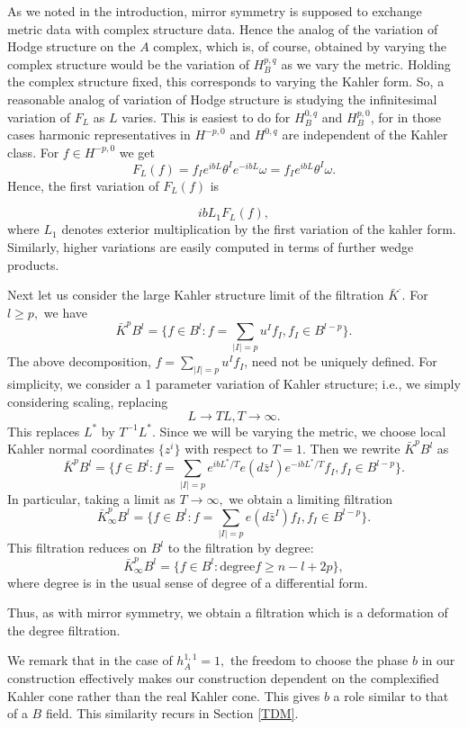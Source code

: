 \documentclass[a4paper,11pt]{amsart}
\begin{document}
As we noted in the introduction, mirror symmetry is supposed to exchange 
metric data with complex structure data.
Hence the analog of the variation of Hodge structure on the $A$ complex, which
is, of course, obtained by varying the complex structure would be the 
variation of $H^{p,q}_B$ as we vary the metric. Holding the complex structure 
fixed, this corresponds to varying the Kahler form. So, a reasonable
analog of variation of Hodge structure is studying the infinitesimal 
variation of $F_L$ as $L$ varies. This is easiest to do for $H_B^{0,q}$ and 
$H^{p,0}_B$, for in those cases harmonic representatives in $H^{-p,0}$ and 
$H^{0,q}$ are independent of the Kahler class.  
For $f\in H^{-p,0}$ we get 
$$F_L(f) = f_Ie^{ibL}\theta^Ie^{-ibL}\omega
 = f_Ie^{ibL}\theta^I\omega.$$
Hence, the first variation of $F_L(f)$ is 
 
$$ibL_1F_L(f),$$
where $L_1$ denotes exterior multiplication by the first variation
 of the kahler 
form. Similarly, higher variations are easily computed in terms of further wedge
 products. 

Next let us consider the large Kahler structure limit of the filtration
$\bar K^{\cdot}$. For $l\geq p,$ we have 
$$\bar K^pB^l = \{f\in B^l:f = \sum_{|I|=p}u^If_I, f_I\in B^{l-p}\}.$$
The above decomposition, $f = \sum_{|I|=p}u^If_I$, need not be uniquely defined.
For simplicity, we consider a 1 parameter
variation of Kahler structure; i.e., we simply considering scaling, replacing 
$$L\rightarrow TL, T\rightarrow\infty.$$
This replaces $L^*$ by $T^{-1}L^*$. Since we will be varying the metric, we 
choose local Kahler normal coordinates $\{z^i\}$ with respect to $T=1$. Then 
we rewrite $\bar K^pB^l$ as 
$$\bar K^pB^l = \{f\in B^l:f = \sum_{|I|=p}e^{ibL^*/T}e(d\bar{z}^I)e^{-ibL^*/T}f_I, f_I\in B^{l-p}\}.$$ 
In particular, taking a limit as $T\rightarrow \infty,$ we obtain a limiting 
filtration 
$$\bar K^p_{\infty}B^l = \{f\in B^l:f = \sum_{|I|=p}e(d\bar{z}^I)f_I, f_I\in B^{l-p}\}.$$  
This filtration reduces on $B^l$ to the filtration by degree: 
$$\bar K^p_{\infty}B^l = \{f\in B^l: \mbox{degree}f\geq n-l+2p\},$$ 
where degree is in the usual sense of degree of a differential form. 
 
Thus, as with mirror symmetry, we obtain a filtration which is a deformation of
the degree filtration. 

We remark that in the case of $h^{1,1}_A = 1,$ the freedom to choose the phase
 $b$ in our construction effectively makes our construction dependent on the 
 complexified Kahler cone rather than the real Kahler cone. This gives $b$ a
 role similar to that of a $B$ field. This similarity recurs in Section \ref{TDM}. 
 
\end{document}
